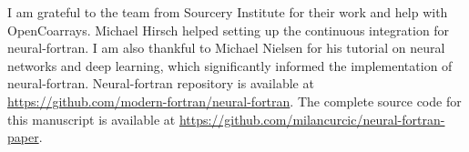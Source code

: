 \documentclass[sigplan, review=false, screen=true, balance=true]{acmart}
\begin{document}
\begin{acks}
I am grateful to the team from Sourcery Institute for their work and help with
OpenCoarrays. Michael Hirsch helped setting up the continuous integration
for neural-fortran. I am also thankful to Michael Nielsen for his tutorial on
neural networks and deep learning, which significantly informed the
implementation of neural-fortran.
Neural-fortran repository is available at
\url{https://github.com/modern-fortran/neural-fortran}.
The complete source code for this manuscript is available at
\url{https://github.com/milancurcic/neural-fortran-paper}.
\end{acks}



\end{document}
